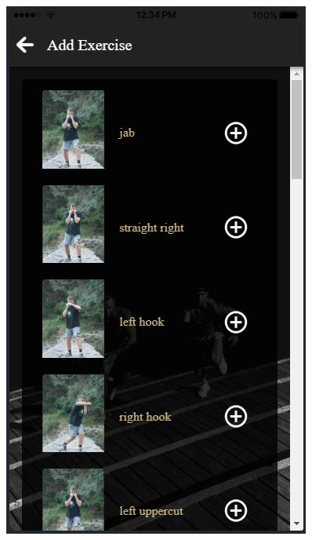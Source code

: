 \documentclass[a4paper,12pt]{article}
\begin{document}
\begin{figure}[!htb]
				\endminipage\hfill
				  \includegraphics[width=\linewidth]{plan2}
				

\end{figure}
\end{document}
